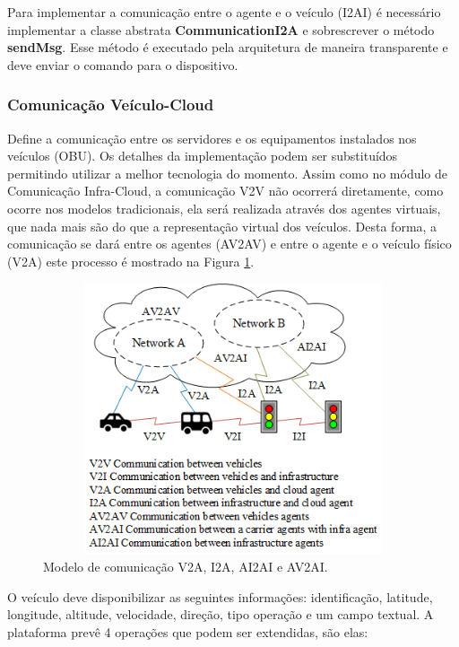 \documentclass[
	12pt,				%
	oneside,			%
	a4paper,			%
	english,			%
	brazil				%
	]{abntex2ppgsi}
\begin{document}
Para implementar a comunicação entre o agente e o veículo (I2AI) é necessário implementar a classe abstrata \textbf{CommunicationI2A} e sobrescrever o método \textbf{sendMsg}. Esse método é executado pela arquitetura de maneira transparente e deve enviar o comando para o dispositivo. 


\subsubsection{Comunicação Veículo-Cloud}

Define a comunicação entre os servidores e os equipamentos instalados nos veículos (OBU). Os detalhes da implementação podem ser substituídos permitindo utilizar a melhor tecnologia do momento. Assim como no módulo de Comunicação Infra-Cloud, a comunicação V2V não ocorrerá diretamente, como ocorre nos modelos tradicionais, ela será realizada através dos agentes virtuais, que nada mais são do que a representação virtual dos veículos. Desta forma, a comunicação se dará entre os agentes (AV2AV) e entre o agente e o veículo físico (V2A) este processo é mostrado na Figura \ref{fig:dComunicacaoAgentes}.
  
\begin{figure}[h!]
	\centering
	\includegraphics [width=12cm,height=8cm] {images/agentemoveis_virtuais.png}
	\caption{Modelo de comunicação V2A, I2A, AI2AI e AV2AI.}
	\label{fig:dComunicacaoAgentes}
\end{figure}

O veículo deve disponibilizar as seguintes informações: identificação, latitude, longitude, altitude, velocidade, direção, tipo operação e um campo textual. A plataforma prevê 4 operações que podem ser extendidas, são elas:
\end{document}
